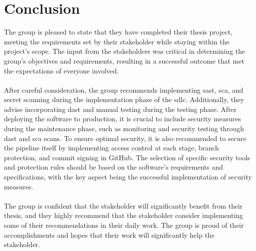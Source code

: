 \section{Conclusion}
The group is pleased to state that they have completed their thesis project, meeting the requirements set by their stakeholder while staying within the project's scope. The input from the stakeholders was critical in determining the group's objectives and requirements, resulting in a successful outcome that met the expectations of everyone involved.
\\~\\
After careful consideration, the group recommends implementing \acrshort{sast}, \acrshort{sca}, and secret scanning during the implementation phase of the \acrlong{sdlc}. Additionally, they advise incorporating \acrshort{dast} and manual testing during the testing phase. After deploying the software to production, it is crucial to include security measures during the maintenance phase, such as monitoring and security testing through \acrshort{dast} and \acrshort{sca} scans. To ensure optimal security, it is also recommended to secure the pipeline itself by implementing access control at each stage, branch protection, and commit signing in GitHub. The selection of specific security tools and protection rules should be based on the software's requirements and specifications, with the key aspect being the successful implementation of security measures.
\\~\\
The group is confident that the stakeholder will significantly benefit from their thesis, and they highly recommend that the stakeholder consider implementing some of their recommendations in their daily work. The group is proud of their accomplishments and hopes that their work will significantly help the stakeholder.
